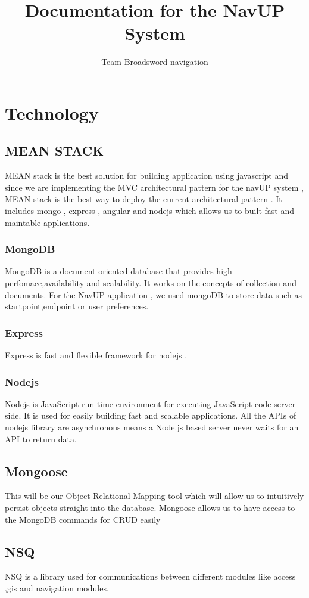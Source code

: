 \documentclass[11pt]{article}
\author{Team Broadsword navigation}
\title{Documentation for the NavUP System}
\begin{document}
	\setlength{\parskip}{6pt}
	

	
	\tableofcontents
	
	\newpage

\section{Technology}
\subsection{MEAN STACK}  
	MEAN stack is the best solution for building application using javascript and since we are implementing the MVC architectural pattern for the navUP system , MEAN stack is the best way to deploy the current architectural pattern . It includes mongo , express , angular and nodejs which allows us to built fast and maintable applications.
\subsubsection{MongoDB}	
MongoDB is a document-oriented database that provides high perfomace,availability and scalability. It works on the concepts of collection and documents. For the NavUP application , we used mongoDB to store data such as startpoint,endpoint or user preferences.
\subsubsection{Express}
Express is fast and flexible framework for nodejs . 
\subsubsection{Nodejs}	
 Nodejs is JavaScript run-time environment for executing JavaScript code server-side. It is used for easily building fast and scalable applications. All the APIs of nodejs library are asynchronous means a Node.js based server never waits for an API to return data. 
 \subsection{Mongoose}
 This will be our Object Relational Mapping tool which will allow us to intuitively
 persist objects straight into the database. Mongoose allows us to have access to the MongoDB commands for CRUD  easily
 \subsection{NSQ} 
NSQ is a library used for communications between different modules like access ,gis and navigation modules. 
\end{document}
